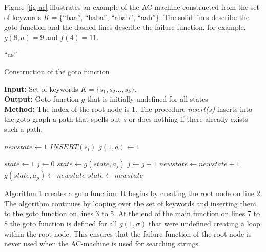 \documentclass[english,twoside,censored,csm,algorithms-track-2020]{HYthesisML}
\theoremstyle{plain}
\theoremstyle{definition}
\begin{document}
Figure \ref{fig-ac} illustrates an example of the AC-machine constructed from the set of
keywords $K=\{$``baa'', ``baba'', ``abab'', ``aab''$\}$. The solid lines describe the goto function
and the dashed lines describe the failure function, for example, $g(8, a) = 9$ and $f(4)=11$.

``as''

\begin{algorithm}[h!]
  
  \caption{Construction of the goto function} \label{ac-goto}
  \hspace*{\algorithmicindent} \textbf{Input:} Set of keywords $K = \{s_1,s_2...,s_k\}$.\\
  \hspace*{\algorithmicindent} \textbf{Output:} Goto function $g$ that is initially undefined for all states\\
  \hspace*{\algorithmicindent} \textbf{Method:} The index of the root node is 1. The procedure \textit{insert($s$)} inserts into the goto graph a path that spells out $s$ or does nothing if there already exists such a path.
  
      \begin{algorithmic}[1]

          \State $newstate\gets 1$
            \State $INSERT(s_i)$
          \EndFor
            \State $g(1,a)\gets 1$
          \EndFor
        \EndFunction

      \item[]

          \State $state\gets 1$
          \State $j\gets 0$
            \State $state\gets g(state,a_j)$
            \State $j\gets j+1$
          \EndWhile
            \State $newstate\gets newstate+1$
            \State $g(state,a_p)\gets newstate$
            \State $state\gets newstate$
          \EndFor
        \EndFunction
      \end{algorithmic}
      
  \end{algorithm}

  Algorithm 1 creates a goto function. It begins by creating the root node on line 2.
  The algorithm continues by looping over the set of keywords and inserting them to the
  goto function on lines 3 to 5. At the end of the main function on lines 7 to 8
  the goto function is defined for all $g(1,\sigma)$ that were undefined creating a loop within
  the root node. This ensures that the failure function of the root node is never used when the
  AC-machine is used for searching strings.
\end{document}
